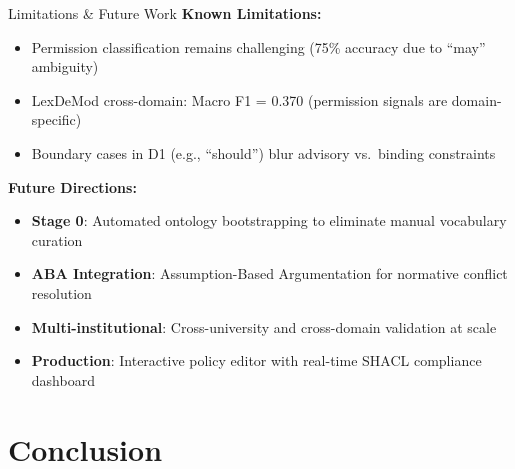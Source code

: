 \documentclass[aspectratio=169, 10pt]{beamer}
\begin{document}
\begin{frame}{Limitations \& Future Work}
    \textbf{Known Limitations:}
    \begin{itemize}
        \item Permission classification remains challenging (75\% accuracy due to ``may'' ambiguity)
        \item LexDeMod cross-domain: Macro F1 = 0.370 (permission signals are domain-specific)
        \item Boundary cases in D1 (e.g., ``should'') blur advisory vs.\ binding constraints
    \end{itemize}
    
    \vspace{0.3cm}
    \textbf{Future Directions:}
    \begin{itemize}
        \item \textbf{Stage 0}: Automated ontology bootstrapping to eliminate manual vocabulary curation
        \item \textbf{ABA Integration}: Assumption-Based Argumentation for normative conflict resolution
        \item \textbf{Multi-institutional}: Cross-university and cross-domain validation at scale
        \item \textbf{Production}: Interactive policy editor with real-time SHACL compliance dashboard
    \end{itemize}
\end{frame}

\section{Conclusion}
\end{document}
